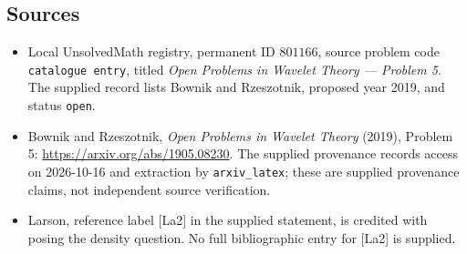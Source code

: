 \documentclass[11pt]{article}
\begin{document}
\subsection{Sources}
\begin{itemize}
\item Local UnsolvedMath registry, permanent ID \(801166\), source problem code \texttt{catalogue entry}, titled \emph{Open Problems in Wavelet Theory --- Problem 5}. The supplied record lists Bownik and Rzeszotnik, proposed year 2019, and status \texttt{open}.
\item Bownik and Rzeszotnik, \emph{Open Problems in Wavelet Theory} (2019), Problem 5: \url{https://arxiv.org/abs/1905.08230}. The supplied provenance records access on 2026-10-16 and extraction by \texttt{arxiv\_latex}; these are supplied provenance claims, not independent source verification.
\item Larson, reference label [La2] in the supplied statement, is credited with posing the density question. No full bibliographic entry for [La2] is supplied.
\end{itemize}
\end{document}
